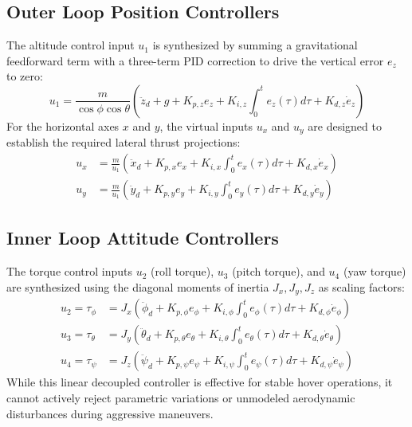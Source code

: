 \subsection{Outer Loop Position Controllers}
The altitude control input $u_1$ is synthesized by summing a gravitational feedforward term with a three-term PID correction to drive the vertical error $e_z$ to zero:
\begin{equation}
u_{1} = \frac{m}{\cos\phi \cos\theta} \left( \ddot{z}_d + g + K_{p,z} e_z + K_{i,z} \int_{0}^{t} e_z(\tau) d\tau + K_{d,z} \dot{e}_z \right)
\end{equation}
For the horizontal axes $x$ and $y$, the virtual inputs $u_x$ and $u_y$ are designed to establish the required lateral thrust projections:
\begin{align}
u_x &= \frac{m}{u_1} \left( \ddot{x}_d + K_{p,x} e_x + K_{i,x} \int_{0}^{t} e_x(\tau) d\tau + K_{d,x} \dot{e}_x \right) \\
u_y &= \frac{m}{u_1} \left( \ddot{y}_d + K_{p,y} e_y + K_{i,y} \int_{0}^{t} e_y(\tau) d\tau + K_{d,y} \dot{e}_y \right)
\end{align}

\subsection{Inner Loop Attitude Controllers}
The torque control inputs $u_2$ (roll torque), $u_3$ (pitch torque), and $u_4$ (yaw torque) are synthesized using the diagonal moments of inertia $J_x, J_y, J_z$ as scaling factors:
\begin{align}
u_2 = \tau_{\phi} &= J_x \left( \ddot{\phi}_d + K_{p,\phi} e_{\phi} + K_{i,\phi} \int_{0}^{t} e_{\phi}(\tau) d\tau + K_{d,\phi} \dot{e}_{\phi} \right) \\
u_3 = \tau_{\theta} &= J_y \left( \ddot{\theta}_d + K_{p,\theta} e_{\theta} + K_{i,\theta} \int_{0}^{t} e_{\theta}(\tau) d\tau + K_{d,\theta} \dot{e}_{\theta} \right) \\
u_4 = \tau_{\psi} &= J_z \left( \ddot{\psi}_d + K_{p,\psi} e_{\psi} + K_{i,\psi} \int_{0}^{t} e_{\psi}(\tau) d\tau + K_{d,\psi} \dot{e}_{\psi} \right)
\end{align}
While this linear decoupled controller is effective for stable hover operations, it cannot actively reject parametric variations or unmodeled aerodynamic disturbances during aggressive maneuvers.

